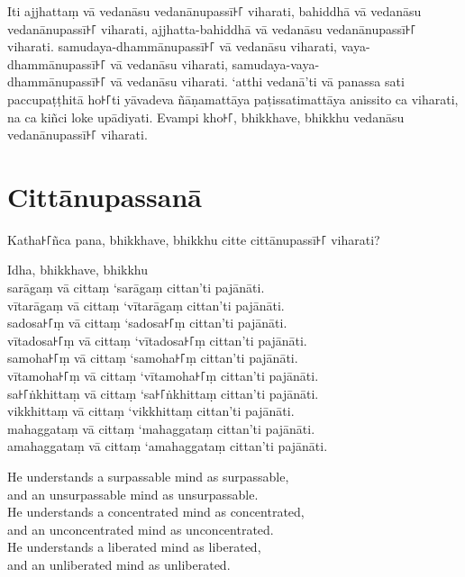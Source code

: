 \paliPage

Iti ajjhattaṃ vā vedanāsu vedanānupassī꜔꜒ viharati, bahiddhā vā vedanāsu
vedanānupassī꜔꜒ viharati, ajjhatta-bahiddhā vā vedanāsu vedanānupassī꜔꜒ viharati.
samudaya-dhammānupassī꜔꜒ vā vedanāsu viharati, vaya-dhammānupassī꜔꜒ vā vedanāsu
viharati, samudaya-vaya-\\
dhammānupassī꜔꜒ vā vedanāsu viharati. ‘atthi vedanā’ti vā panassa sati
paccupaṭṭhitā ho꜔꜒ti yāvadeva ñāṇamattāya paṭissatimattāya anissito ca viharati,
na ca kiñci loke upādiyati. Evampi kho꜔꜒, bhikkhave, bhikkhu vedanāsu
vedanānupassī꜔꜒ viharati.


\chapter*{Cittānupassanā}

Katha꜔꜒ñca pana, bhikkhave, bhikkhu citte cittānupassī꜔꜒ viharati?

Idha, bhikkhave, bhikkhu\\
sarāgaṃ vā cittaṃ ‘sarāgaṃ cittan’ti pajānāti.\\
vītarāgaṃ vā cittaṃ ‘vītarāgaṃ cittan’ti pajānāti.\\
sadosa꜔꜒ṃ vā cittaṃ ‘sadosa꜔꜒ṃ cittan’ti pajānāti.\\
vītadosa꜔꜒ṃ vā cittaṃ ‘vītadosa꜔꜒ṃ cittan’ti pajānāti.\\
samoha꜔꜒ṃ vā cittaṃ ‘samoha꜔꜒ṃ cittan’ti pajānāti.\\
vītamoha꜔꜒ṃ vā cittaṃ ‘vītamoha꜔꜒ṃ cittan’ti pajānāti.\\
sa꜔꜒ṅkhittaṃ vā cittaṃ ‘sa꜔꜒ṅkhittaṃ cittan’ti pajānāti.\\
vikkhittaṃ vā cittaṃ ‘vikkhittaṃ cittan’ti pajānāti.\\
mahaggataṃ vā cittaṃ ‘mahaggataṃ cittan’ti pajānāti.\\
amahaggataṃ vā cittaṃ ‘amahaggataṃ cittan’ti pajānāti.

\englishPage

He understands a surpassable mind as surpassable,\\
and an unsurpassable mind as unsurpassable.\\
He understands a concentrated mind as concentrated,\\
and an unconcentrated mind as unconcentrated.\\
He understands a liberated mind as liberated,\\
and an unliberated mind as unliberated.

